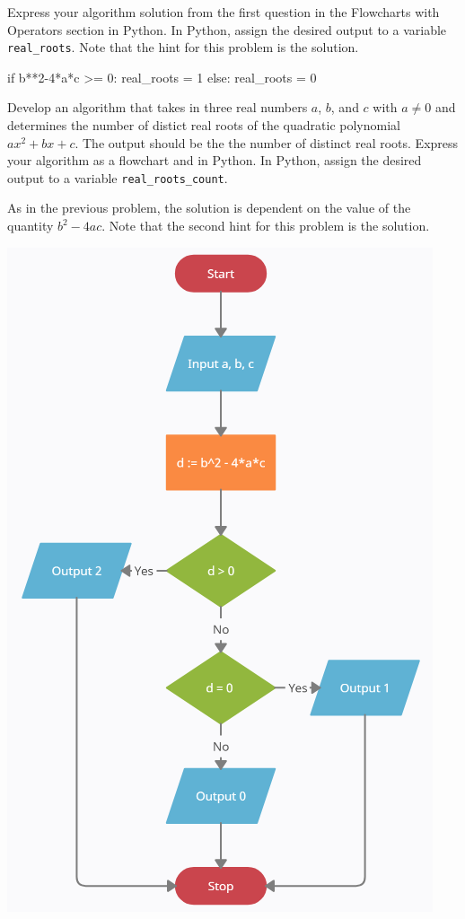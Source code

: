 \documentclass{ximera}
\begin{document}
\begin{question}
	Express your algorithm solution from the first question in the Flowcharts with Operators section in Python. In Python, assign the desired output to a variable \verb|real_roots|.  Note that the hint for this problem is the solution. 
	\begin{hint}
\begin{sageCell}
if b**2-4*a*c >= 0:
	real_roots = 1
else:
	real_roots = 0
\end{sageCell}
	\end{hint}
\end{question}

\begin{question}
	Develop an algorithm that takes in three real numbers $a$, $b$, and $c$ with $a\neq 0$ and determines the number of distict real roots of the quadratic polynomial $ax^2+bx+c$. The output should be the the number of distinct real roots. Express your algorithm as a flowchart and in Python. In Python, assign the desired output to a variable \verb|real_roots_count|.
	\begin{hint}
	As in the previous problem, the solution is dependent on the value of the quantity $b^2-4ac$. Note that the second hint for this problem is the solution.
	\end{hint}
	\begin{hint}
		\begin{center}
			\includegraphics{realrootscount.png}

\end{center}
\end{hint}
\end{question}
\end{document}
